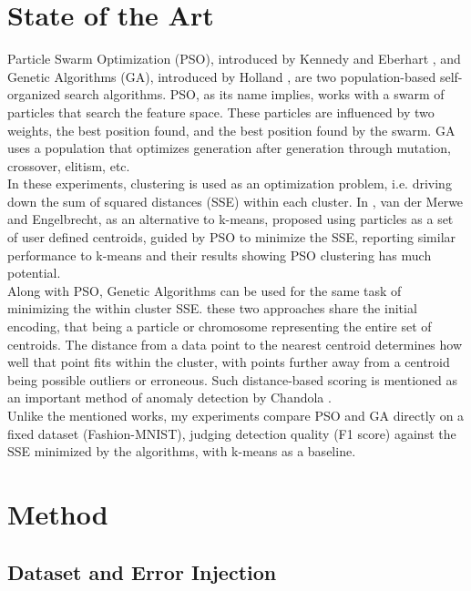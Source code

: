 \documentclass[11pt,a4paper]{article}
\begin{document}
\section{State of the Art}
Particle Swarm Optimization (PSO), introduced by Kennedy and Eberhart \cite{kennedy1995particle}, and Genetic Algorithms (GA), introduced by Holland \cite{holland1992adaptation}, are two population-based self-organized search algorithms. PSO, as its name implies, works with a swarm of particles that search the feature space. These particles are influenced by two weights, the best position found, and the best position found by the swarm. GA uses a population that optimizes generation after generation through mutation, crossover, elitism, etc. \\

In these experiments, clustering is used as an optimization problem, i.e. driving down the sum of squared distances (SSE) within each cluster. In \cite{van2003data}, van der Merwe and Engelbrecht, as an alternative to k-means, proposed using particles as a set of user defined centroids, guided by PSO to minimize the SSE, reporting similar performance to k-means and their results showing PSO clustering has much potential. \\ 

Along with PSO, Genetic Algorithms can be used for the same task of minimizing the within cluster SSE. these two approaches share the initial encoding, that being a particle or chromosome representing the entire set of centroids. The distance from a data point to the nearest centroid determines how well that point fits within the cluster, with points further away from a centroid being possible outliers or erroneous. Such distance-based scoring is mentioned as an important method of anomaly detection by Chandola \cite{chandola2009anomaly}. \\

Unlike the mentioned works, my experiments compare PSO and GA directly on a fixed dataset (Fashion-MNIST), judging detection quality (F1 score) against the SSE minimized by the algorithms, with k-means as a baseline. \\

\section{Method}

\subsection{Dataset and Error Injection} 
\end{document}
